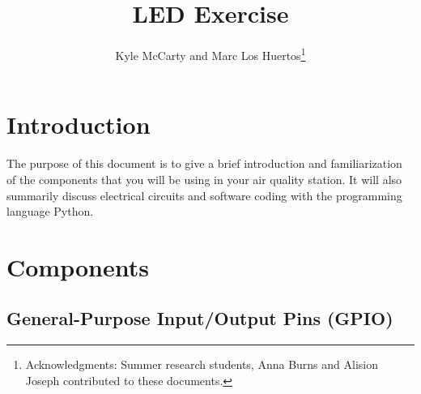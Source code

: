 \documentclass{article}\usepackage[]{graphicx}\usepackage[]{color}
\title{LED Exercise}
\author{Kyle McCarty and Marc Los Huertos\footnote{Acknowledgments: Summer research students, Anna Burns and Alision Joseph contributed to these documents.}}
\begin{document}
\maketitle

\newpage

\tableofcontents

\newpage

\section{Introduction}

The purpose of this document is to give a brief introduction and familiarization of the components that you will be using in your air quality station. It will also summarily discuss electrical circuits and software coding with the programming language Python.

\section{Components}

\subsection{General-Purpose Input/Output Pins (GPIO)}
\end{document}
